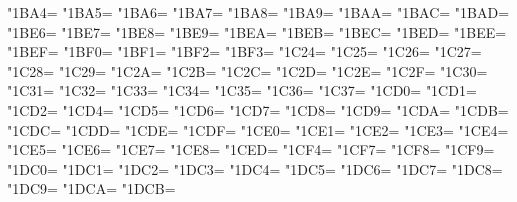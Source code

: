 \XeTeXcharclass"1BA4=\KclassCM
\XeTeXcharclass"1BA5=\KclassCM
\XeTeXcharclass"1BA6=\KclassCM
\XeTeXcharclass"1BA7=\KclassCM
\XeTeXcharclass"1BA8=\KclassCM
\XeTeXcharclass"1BA9=\KclassCM
\XeTeXcharclass"1BAA=\KclassCM
\XeTeXcharclass"1BAC=\KclassCM
\XeTeXcharclass"1BAD=\KclassCM
\XeTeXcharclass"1BE6=\KclassCM
\XeTeXcharclass"1BE7=\KclassCM
\XeTeXcharclass"1BE8=\KclassCM
\XeTeXcharclass"1BE9=\KclassCM
\XeTeXcharclass"1BEA=\KclassCM
\XeTeXcharclass"1BEB=\KclassCM
\XeTeXcharclass"1BEC=\KclassCM
\XeTeXcharclass"1BED=\KclassCM
\XeTeXcharclass"1BEE=\KclassCM
\XeTeXcharclass"1BEF=\KclassCM
\XeTeXcharclass"1BF0=\KclassCM
\XeTeXcharclass"1BF1=\KclassCM
\XeTeXcharclass"1BF2=\KclassCM
\XeTeXcharclass"1BF3=\KclassCM
\XeTeXcharclass"1C24=\KclassCM
\XeTeXcharclass"1C25=\KclassCM
\XeTeXcharclass"1C26=\KclassCM
\XeTeXcharclass"1C27=\KclassCM
\XeTeXcharclass"1C28=\KclassCM
\XeTeXcharclass"1C29=\KclassCM
\XeTeXcharclass"1C2A=\KclassCM
\XeTeXcharclass"1C2B=\KclassCM
\XeTeXcharclass"1C2C=\KclassCM
\XeTeXcharclass"1C2D=\KclassCM
\XeTeXcharclass"1C2E=\KclassCM
\XeTeXcharclass"1C2F=\KclassCM
\XeTeXcharclass"1C30=\KclassCM
\XeTeXcharclass"1C31=\KclassCM
\XeTeXcharclass"1C32=\KclassCM
\XeTeXcharclass"1C33=\KclassCM
\XeTeXcharclass"1C34=\KclassCM
\XeTeXcharclass"1C35=\KclassCM
\XeTeXcharclass"1C36=\KclassCM
\XeTeXcharclass"1C37=\KclassCM
\XeTeXcharclass"1CD0=\KclassCM
\XeTeXcharclass"1CD1=\KclassCM
\XeTeXcharclass"1CD2=\KclassCM
\XeTeXcharclass"1CD4=\KclassCM
\XeTeXcharclass"1CD5=\KclassCM
\XeTeXcharclass"1CD6=\KclassCM
\XeTeXcharclass"1CD7=\KclassCM
\XeTeXcharclass"1CD8=\KclassCM
\XeTeXcharclass"1CD9=\KclassCM
\XeTeXcharclass"1CDA=\KclassCM
\XeTeXcharclass"1CDB=\KclassCM
\XeTeXcharclass"1CDC=\KclassCM
\XeTeXcharclass"1CDD=\KclassCM
\XeTeXcharclass"1CDE=\KclassCM
\XeTeXcharclass"1CDF=\KclassCM
\XeTeXcharclass"1CE0=\KclassCM
\XeTeXcharclass"1CE1=\KclassCM
\XeTeXcharclass"1CE2=\KclassCM
\XeTeXcharclass"1CE3=\KclassCM
\XeTeXcharclass"1CE4=\KclassCM
\XeTeXcharclass"1CE5=\KclassCM
\XeTeXcharclass"1CE6=\KclassCM
\XeTeXcharclass"1CE7=\KclassCM
\XeTeXcharclass"1CE8=\KclassCM
\XeTeXcharclass"1CED=\KclassCM
\XeTeXcharclass"1CF4=\KclassCM
\XeTeXcharclass"1CF7=\KclassCM
\XeTeXcharclass"1CF8=\KclassCM
\XeTeXcharclass"1CF9=\KclassCM
\XeTeXcharclass"1DC0=\KclassCM
\XeTeXcharclass"1DC1=\KclassCM
\XeTeXcharclass"1DC2=\KclassCM
\XeTeXcharclass"1DC3=\KclassCM
\XeTeXcharclass"1DC4=\KclassCM
\XeTeXcharclass"1DC5=\KclassCM
\XeTeXcharclass"1DC6=\KclassCM
\XeTeXcharclass"1DC7=\KclassCM
\XeTeXcharclass"1DC8=\KclassCM
\XeTeXcharclass"1DC9=\KclassCM
\XeTeXcharclass"1DCA=\KclassCM
\XeTeXcharclass"1DCB=\KclassCM
